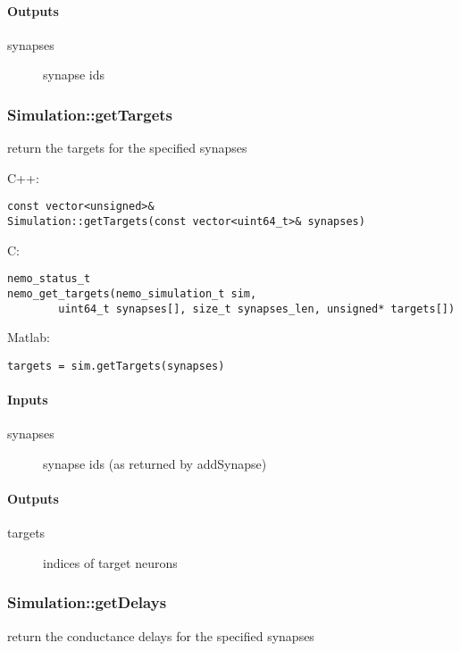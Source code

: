 \paragraph{Outputs}
\begin{description}
\item[synapses] synapse ids
\end{description}

\clearpage
\subsubsection*{Simulation::getTargets}
\label{fn: getTargets}
return the targets for the specified synapses


\noindent C++:
\begin{lstlisting}[aboveskip=2pt]
const vector<unsigned>&
Simulation::getTargets(const vector<uint64_t>& synapses)
\end{lstlisting}

\noindent C:
\begin{lstlisting}[aboveskip=2pt]
nemo_status_t
nemo_get_targets(nemo_simulation_t sim, 
        uint64_t synapses[], size_t synapses_len, unsigned* targets[])
\end{lstlisting}

\noindent Matlab:
\begin{lstlisting}[aboveskip=2pt]
targets = sim.getTargets(synapses)
\end{lstlisting}
\paragraph{Inputs}
\begin{description}
\item[synapses] synapse ids (as returned by addSynapse)
\end{description}
\paragraph{Outputs}
\begin{description}
\item[targets] indices of target neurons
\end{description}

\clearpage
\subsubsection*{Simulation::getDelays}
\label{fn: getDelays}
return the conductance delays for the specified synapses


